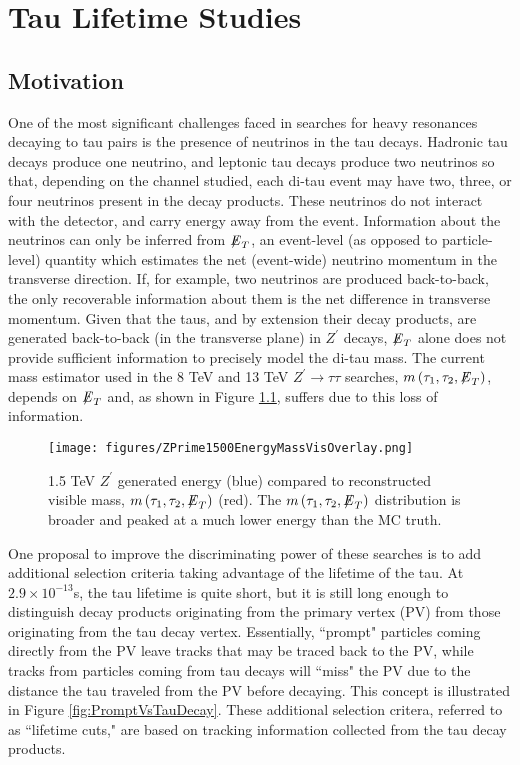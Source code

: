 \chapter{Tau Lifetime Studies}

\section{Motivation}

One of the most significant challenges faced in searches for heavy resonances decaying to tau pairs is the presence of neutrinos in the tau decays. Hadronic tau decays produce one neutrino, and leptonic tau decays produce two neutrinos so that, depending on the channel studied, each di-tau event may have two, three, or four neutrinos present in the decay products. These neutrinos do not interact with the detector, and carry energy away from the event. Information about the neutrinos can only be inferred from ${\not\mathrel{E}}_T$, an event-level (as opposed to particle-level) quantity which estimates the net (event-wide) neutrino momentum in the transverse direction. If, for example, two neutrinos are produced back-to-back, the only recoverable information about them is the net difference in transverse momentum. Given that the taus, and by extension their decay products, are generated back-to-back (in the transverse plane) in $Z^\prime$ decays, ${\not\mathrel{E}}_T$ alone does not provide sufficient information to precisely model the di-tau mass. The current mass estimator used in the 8 TeV and 13 TeV $Z^\prime\to\tau\tau$ searches, $m\left(\tau_1, \tau_2, {\not\mathrel{E}}_T\right)$, depends on ${\not\mathrel{E}}_T$ and, as shown in Figure \ref{fig:massVisSigVsMC}, suffers due to this loss of information.

\begin{figure}[tbh!]
\centering
\texttt{[image: figures/ZPrime1500EnergyMassVisOverlay.png]}
\caption{1.5 TeV $Z^\prime$ generated energy (blue) compared to reconstructed visible mass, $m\left(\tau_1, \tau_2, {\not\mathrel{E}}_T\right)$ (red). The $m\left(\tau_1, \tau_2, {\not\mathrel{E}}_T\right)$ distribution is broader and peaked at a much lower energy than the MC truth.}
\label{fig:massVisSigVsMC}
\end{figure}

One proposal to improve the discriminating power of these searches is to add additional selection criteria taking advantage of the lifetime of the tau. At $2.9\times 10^{-13}$s, the tau lifetime is quite short, but it is still long enough to distinguish decay products originating from the primary vertex (PV) from those originating from the tau decay vertex. Essentially, ``prompt" particles coming directly from the PV leave tracks that may be traced back to the PV, while tracks from particles coming from tau decays will ``miss" the PV due to the distance the tau traveled from the PV before decaying. This concept is illustrated in Figure \ref{fig:PromptVsTauDecay}. These additional selection critera, referred to as ``lifetime cuts," are based on tracking information collected from the tau decay products.

